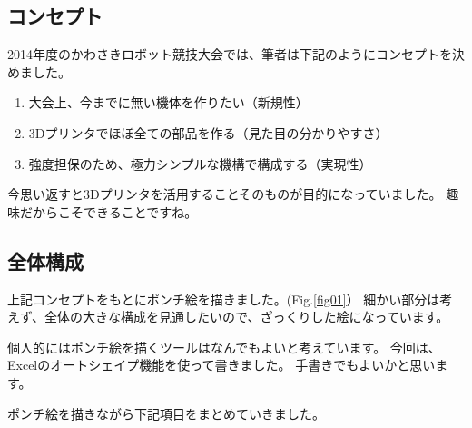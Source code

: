 \subsection{コンセプト}\label{ux30b3ux30f3ux30bbux30d7ux30c8}

2014年度のかわさきロボット競技大会では、筆者は下記のようにコンセプトを決めました。

\begin{enumerate}
\def\labelenumi{\arabic{enumi}.}
\tightlist
\item
  大会上、今までに無い機体を作りたい（新規性）
\item
  3Dプリンタでほぼ全ての部品を作る（見た目の分かりやすさ）
\item
  強度担保のため、極力シンプルな機構で構成する（実現性）
\end{enumerate}

今思い返すと3Dプリンタを活用することそのものが目的になっていました。
趣味だからこそできることですね。

\subsection{全体構成}\label{ux5168ux4f53ux69cbux6210}

上記コンセプトをもとにポンチ絵を描きました。(Fig.\ref{fig01}）
細かい部分は考えず、全体の大きな構成を見通したいので、ざっくりした絵になっています。

個人的にはポンチ絵を描くツールはなんでもよいと考えています。
今回は、Excelのオートシェイプ機能を使って書きました。
手書きでもよいかと思います。

ポンチ絵を描きながら下記項目をまとめていきました。

